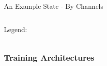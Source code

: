 \begin{frame}{An Example State - By Channels}
    \begin{columns}
        \begin{column}{0.4\linewidth}
            Legend:
            \begin{figure}
                \resizebox{!}{0.5\linewidth}{%
                
                }
            \end{figure}
        \end{column}
        \begin{column}{0.6\linewidth}
            \centering
            \begin{figure}
                \resizebox{!}{0.75\linewidth}{%
                    
                }
            \end{figure}
        \end{column}
    \end{columns}
\end{frame}


\subsubsection{Training Architectures}

